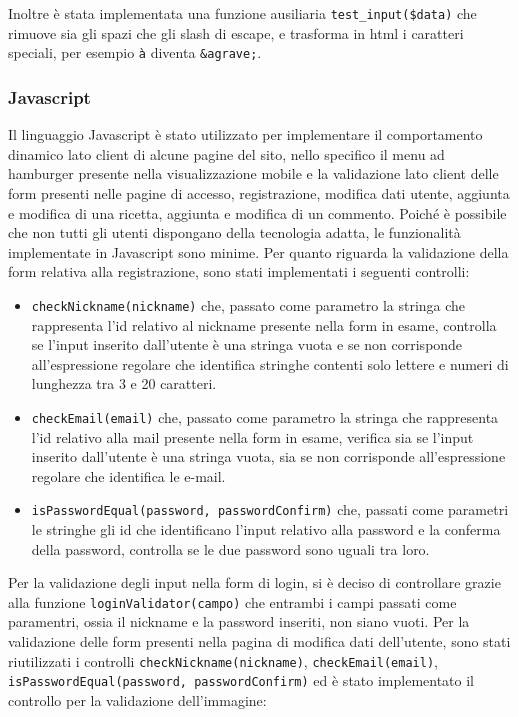 Inoltre è stata implementata una funzione ausiliaria \texttt{test_input(\$data)} che rimuove sia gli spazi che gli slash di escape, e trasforma in html i caratteri speciali, per esempio \texttt{à} diventa \texttt{&agrave;}.

\subsubsection{Javascript}\label{subs:javascript}
Il linguaggio Javascript è stato utilizzato per implementare il comportamento dinamico lato client di alcune pagine del sito, nello specifico il menu ad hamburger presente nella visualizzazione mobile e la validazione lato client delle form presenti nelle pagine di accesso, registrazione, modifica dati utente, aggiunta e modifica di una ricetta, aggiunta e modifica di un commento.
Poiché è possibile che non tutti gli utenti dispongano della tecnologia adatta, le funzionalità implementate in Javascript sono minime. \newline
Per quanto riguarda la validazione della form relativa alla registrazione, sono stati implementati i seguenti controlli:
\begin{itemize}
	\item \texttt{checkNickname(nickname)} che, passato come parametro la stringa che rappresenta l'id relativo al nickname presente nella form in esame, controlla se l'input inserito dall'utente è una stringa vuota e se non corrisponde all'espressione regolare che identifica stringhe contenti solo lettere e numeri di lunghezza tra 3 e 20 caratteri.
	\item \texttt{checkEmail(email)} che, passato come parametro la stringa che rappresenta l'id relativo alla mail presente nella form in esame, verifica sia se l'input inserito dall'utente è una stringa vuota, sia se non corrisponde all'espressione regolare che identifica le e-mail.
	\item \texttt{isPasswordEqual(password, passwordConfirm)} che, passati come parametri le stringhe gli id che identificano l'input relativo alla password e la conferma della password, controlla se le due password sono uguali tra loro.
\end{itemize}
Per la validazione degli input nella form di login, si è deciso di controllare grazie alla funzione \texttt{loginValidator(campo)} che entrambi i campi passati come paramentri, ossia il nickname e la password inseriti, non siano vuoti. \newline
Per la validazione delle form presenti nella pagina di modifica dati dell'utente, sono stati riutilizzati i controlli \texttt{checkNickname(nickname)}, \texttt{checkEmail(email)}, \texttt{isPasswordEqual(password, passwordConfirm)} ed è stato implementato il controllo per la validazione dell'immagine:
